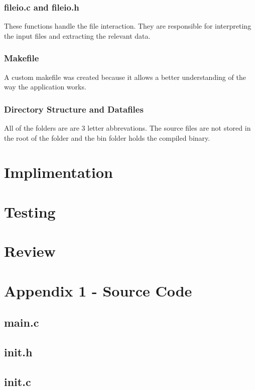 \documentclass{article}
\begin{document}
\subsubsection{fileio.c and fileio.h}
These functions handle the file interaction. They are responsible for interpreting the input files and extracting the relevant data.

\subsubsection{Makefile}
A custom makefile was created because it allows a better understanding of the way the application works. 

\subsubsection{Directory Structure and Datafiles}
All of the folders are are 3 letter abbrevations. The source files are not stored in the root of the folder and the bin folder holds the compiled binary.

\section{Implimentation}

\section{Testing}

\section{Review}

\section{Appendix 1 - Source Code}

\subsection{main.c}


\subsection{init.h}


\subsection{init.c}

\end{document}
